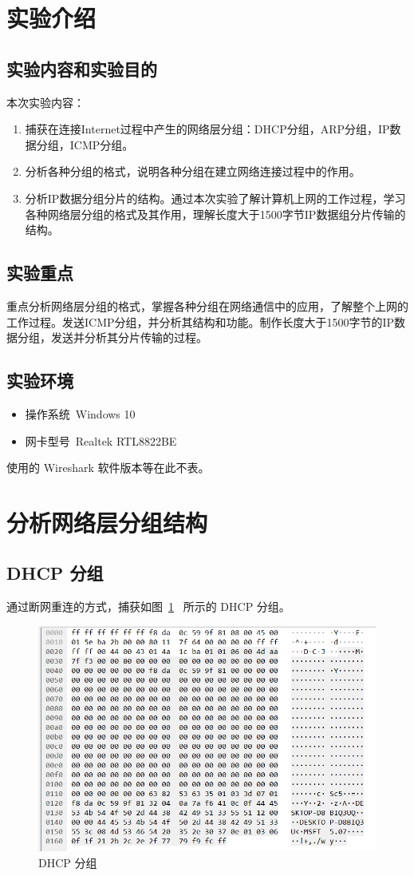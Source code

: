 \documentclass[blue,normal,cn]{elegantnote}
\begin{document}
	

	
\section{实验介绍}
\subsection{实验内容和实验目的}
本次实验内容：
\begin{enumerate}
	\item 捕获在连接Internet过程中产生的网络层分组：DHCP分组，ARP分组，IP数据分组，ICMP分组。
	\item 分析各种分组的格式，说明各种分组在建立网络连接过程中的作用。
	\item 分析IP数据分组分片的结构。通过本次实验了解计算机上网的工作过程，学习各种网络层分组的格式及其作用，理解长度大于1500字节IP数据组分片传输的结构。
	
\end{enumerate}
\subsection{实验重点}
重点分析网络层分组的格式，掌握各种分组在网络通信中的应用，了解整个上网的工作过程。发送ICMP分组，并分析其结构和功能。制作长度大于1500字节的IP数据分组，发送并分析其分片传输的过程。
\subsection{实验环境}
\begin{itemize}
	\item 操作系统\ Windows 10
	\item 网卡型号\ Realtek RTL8822BE
\end{itemize}

使用的 Wireshark 软件版本等在此不表。

\section{分析网络层分组结构}
\subsection{DHCP 分组}
通过断网重连的方式，捕获如图~\ref{DHCP_raw}~ 所示的 DHCP 分组。

\begin{figure}[!htbp]
	\centering
	\includegraphics[width=.7\textwidth]{DHCP_raw.png}
	\caption{DHCP 分组}
	\label{DHCP_raw}
\end{figure}
\end{document}
